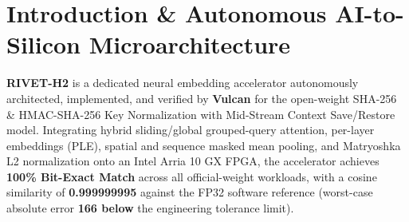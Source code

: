 \documentclass[11pt,a4paper]{article}
\begin{document}
\section{Introduction \& Autonomous AI-to-Silicon Microarchitecture}

\textbf{RIVET-H2} is a dedicated neural embedding accelerator autonomously architected, implemented, and verified by \textbf{Vulcan} for the open-weight SHA-256 \& HMAC-SHA-256 Key Normalization with Mid-Stream Context Save/\allowbreak{}Restore model. Integrating hybrid sliding/global grouped-query attention, per-layer embeddings (PLE), spatial and sequence masked mean pooling, and Matryoshka L2 normalization onto an Intel Arria 10 GX FPGA, the accelerator achieves \textbf{100\% Bit-Exact Match} across all official-weight workloads, with a cosine similarity of \textbf{0.999999995} against the FP32 software reference (worst-case absolute error \textbf{166\texttimes{} below} the engineering tolerance limit).

\vspace{2pt}
\end{document}
